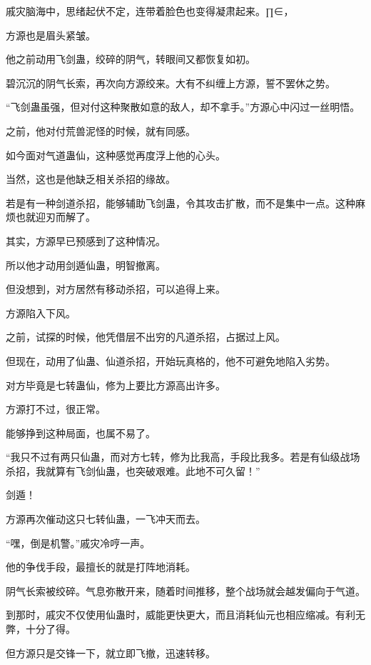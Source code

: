 
\begin{this_body}

戚灾脑海中，思绪起伏不定，连带着脸色也变得凝肃起来。∏∈，

方源也是眉头紧皱。

他之前动用飞剑蛊，绞碎的阴气，转眼间又都恢复如初。

碧沉沉的阴气长索，再次向方源绞来。大有不纠缠上方源，誓不罢休之势。

“飞剑蛊虽强，但对付这种聚散如意的敌人，却不拿手。”方源心中闪过一丝明悟。

之前，他对付荒兽泥怪的时候，就有同感。

如今面对气道蛊仙，这种感觉再度浮上他的心头。

当然，这也是他缺乏相关杀招的缘故。

若是有一种剑道杀招，能够辅助飞剑蛊，令其攻击扩散，而不是集中一点。这种麻烦也就迎刃而解了。

其实，方源早已预感到了这种情况。

所以他才动用剑遁仙蛊，明智撤离。

但没想到，对方居然有移动杀招，可以追得上来。

方源陷入下风。

之前，试探的时候，他凭借层不出穷的凡道杀招，占据过上风。

但现在，动用了仙蛊、仙道杀招，开始玩真格的，他不可避免地陷入劣势。

对方毕竟是七转蛊仙，修为上要比方源高出许多。

方源打不过，很正常。

能够挣到这种局面，也属不易了。

“我只不过有两只仙蛊，而对方七转，修为比我高，手段比我多。若是有仙级战场杀招，我就算有飞剑仙蛊，也突破艰难。此地不可久留！”

剑遁！

方源再次催动这只七转仙蛊，一飞冲天而去。

“嘿，倒是机警。”戚灾冷哼一声。

他的争伐手段，最擅长的就是打阵地消耗。

阴气长索被绞碎。气息弥散开来，随着时间推移，整个战场就会越发偏向于气道。

到那时，戚灾不仅使用仙蛊时，威能更快更大，而且消耗仙元也相应缩减。有利无弊，十分了得。

但方源只是交锋一下，就立即飞撤，迅速转移。


\end{this_body}
